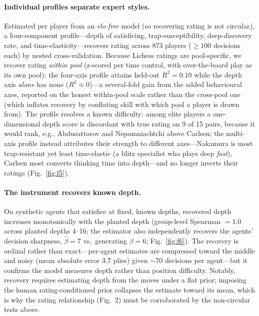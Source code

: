 \documentclass[11pt]{article}
\begin{document}
\paragraph{Individual profiles separate expert styles.} Estimated per player from an
\emph{elo-free} model (so recovering rating is not circular), a four-component profile---depth
of satisficing, trap-susceptibility, deep-discovery rate, and time-elasticity---recovers
rating across 873 players ($\ge100$ decisions each) by nested cross-validation. Because Lichess
ratings are pool-specific, we recover rating \emph{within pool} (z-scored per time control, with
over-the-board play as its own pool): the four-axis profile attains held-out $R^2=0.10$ while the
depth axis \emph{alone} has none ($R^2\approx0$)---a several-fold gain from the added behavioural
axes, reported on the honest within-pool scale rather than the cross-pool one (which inflates
recovery by conflating skill with which pool a player is drawn from). The profile resolves a known difficulty: among elite players a
one-dimensional depth score is discordant with true rating on 9 of 15 pairs, because it would
rank, e.g., Abdusattorov and Nepomniachtchi above Carlsen; the multi-axis profile instead
attributes their strength to different axes---Nakamura is most trap-resistant yet least
time-elastic (a blitz specialist who plays deep \emph{fast}), Carlsen most converts thinking
time into depth---and no longer inverts their ratings (Fig.~\ref{fig:f5}).

\paragraph{The instrument recovers known depth.} On synthetic agents that satisfice at fixed,
known depths, recovered depth increases monotonically with the planted depth (group-level
Spearman $=1.0$ across planted depths 4--16; the estimator also independently recovers the
agents' decision sharpness, $\hat\beta=7$ vs.\ generating $\beta=6$; Fig.~\ref{fig:f6}). The
recovery is ordinal rather than exact---per-agent estimates are compressed toward the middle
and noisy (mean absolute error $3.7$ plies) given $\sim70$ decisions per agent---but it
confirms the model measures depth rather than position difficulty. Notably, recovery requires
estimating depth from the moves under a flat prior; imposing the human rating-conditioned
prior collapses the estimate toward its mean, which is why the rating relationship (Fig.~2)
must be corroborated by the non-circular tests above.
\end{document}
